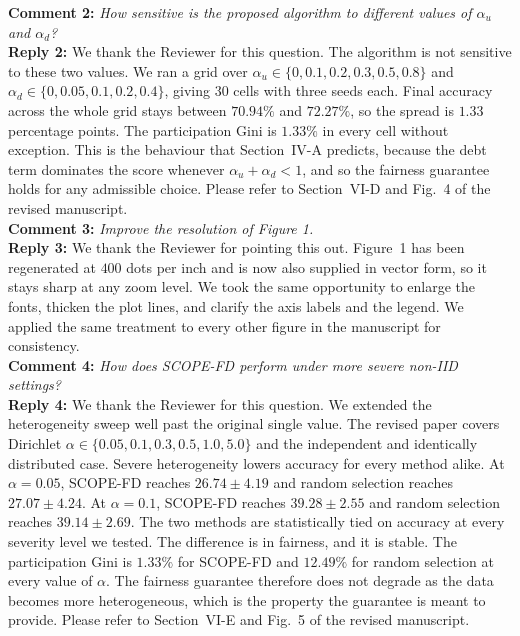 \documentclass[10pt]{article}
\begin{document}
\noindent
\textbf{Comment 2:} \textit{How sensitive is the proposed algorithm to different values of $\alpha_u$ and $\alpha_d$?} \\
\noindent
\textbf{Reply 2:} {We thank the Reviewer for this question. The algorithm is not sensitive to these two values. We ran a grid over $\alpha_u \in \{0, 0.1, 0.2, 0.3, 0.5, 0.8\}$ and $\alpha_d \in \{0, 0.05, 0.1, 0.2, 0.4\}$, giving $30$ cells with three seeds each. Final accuracy across the whole grid stays between $70.94\%$ and $72.27\%$, so the spread is $1.33$ percentage points. The participation Gini is $1.33\%$ in every cell without exception. This is the behaviour that Section~IV-A predicts, because the debt term dominates the score whenever $\alpha_u + \alpha_d < 1$, and so the fairness guarantee holds for any admissible choice. Please refer to Section~VI-D and Fig.~4 of the revised manuscript.}\\

\noindent
\textbf{Comment 3:} \textit{Improve the resolution of Figure 1.} \\
\noindent
\textbf{Reply 3:} {We thank the Reviewer for pointing this out. Figure~1 has been regenerated at $400$ dots per inch and is now also supplied in vector form, so it stays sharp at any zoom level. We took the same opportunity to enlarge the fonts, thicken the plot lines, and clarify the axis labels and the legend. We applied the same treatment to every other figure in the manuscript for consistency.}\\

\noindent
\textbf{Comment 4:} \textit{How does SCOPE-FD perform under more severe non-IID settings?} \\
\noindent
\textbf{Reply 4:} {We thank the Reviewer for this question. We extended the heterogeneity sweep well past the original single value. The revised paper covers Dirichlet $\alpha \in \{0.05, 0.1, 0.3, 0.5, 1.0, 5.0\}$ and the independent and identically distributed case. Severe heterogeneity lowers accuracy for every method alike. At $\alpha = 0.05$, SCOPE-FD reaches $26.74 \pm 4.19$ and random selection reaches $27.07 \pm 4.24$. At $\alpha = 0.1$, SCOPE-FD reaches $39.28 \pm 2.55$ and random selection reaches $39.14 \pm 2.69$. The two methods are statistically tied on accuracy at every severity level we tested. The difference is in fairness, and it is stable. The participation Gini is $1.33\%$ for SCOPE-FD and $12.49\%$ for random selection at every value of $\alpha$. The fairness guarantee therefore does not degrade as the data becomes more heterogeneous, which is the property the guarantee is meant to provide. Please refer to Section~VI-E and Fig.~5 of the revised manuscript.}\\
\end{document}
